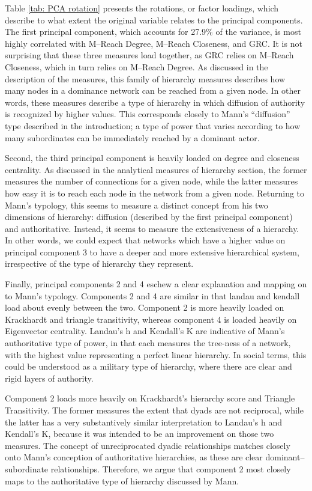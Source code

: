 \documentclass[3p,times]{elsarticle}
\begin{document}
Table \ref{tab: PCA rotation} presents the rotations, or factor loadings, which describe to what extent the original variable relates to the principal components. The first principal component, which accounts for 27.9\% of the variance, is most highly correlated with M--Reach Degree, M--Reach Closeness, and GRC. It is not surprising that these three measures load together, as GRC relies on M--Reach Closeness, which in turn relies on M--Reach Degree. As discussed in the description of the measures, this family of hierarchy measures describes how many nodes in a dominance network can be reached from a given node. In other words, these measures describe a type of hierarchy in which diffusion of authority is recognized by higher values. This corresponds closely to Mann's ``diffusion'' type described in the introduction; a type of power that varies according to how many subordinates can be immediately reached by a dominant actor.

Second, the third principal component is heavily loaded on degree and closeness centrality. As discussed in the analytical measures of hierarchy section, the former measures the number of connections for a given node, while the latter measures how easy it is to reach each node in the network from a given node. Returning to Mann's typology, this seems to measure a distinct concept from his two dimensions of hierarchy: diffusion (described by the first principal component) and authoritative. Instead, it seems to measure the extensiveness of a hierarchy. In other words, we could expect that networks which have a higher value on principal component 3 to have a deeper and more extensive hierarchical system, irrespective of the type of hierarchy they represent.

Finally, principal components 2 and 4 eschew a clear explanation and mapping on to Mann's typology. Components 2 and 4 are similar in that landau and kendall load about evenly between the two. Component 2 is more heavily loaded on Krackhardt and triangle transitivity, whereas component 4 is loaded heavily on Eigenvector centrality. Landau's h and Kendall's K are indicative of Mann's authoritative type of power, in that each measures the tree-ness of a network, with the highest value representing a perfect linear hierarchy. In social terms, this could be understood as a military type of hierarchy, where there are clear and rigid layers of authority. 

Component 2 loads more heavily on Krackhardt's hierarchy score and Triangle Transitivity. The former measures the extent that dyads are not reciprocal, while the latter has a very substantively similar interpretation to Landau's h and Kendall's K, because it was intended to be an improvement on those two measures. The concept of unreciprocated dyadic relationships matches closely onto Mann's conception of authoritative hierarchies, as these are clear dominant--subordinate relationships. Therefore, we argue that component 2 most closely maps to the authoritative type of hierarchy discussed by Mann.
\end{document}
